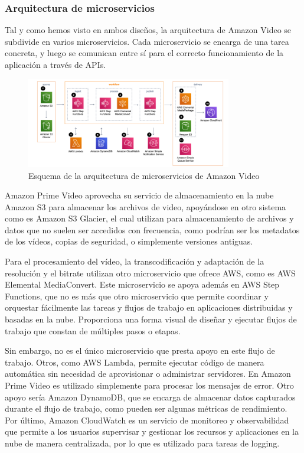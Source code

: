 \documentclass[12pt,a4paper]{article}
\begin{document}
    \subsubsection{Arquitectura de microservicios}

    Tal y como hemos visto en ambos diseños, la arquitectura de Amazon Video se subdivide en varios microservicios. Cada microservicio se encarga de una tarea concreta, y luego se comunican entre sí para el correcto funcionamiento de la aplicación a través de APIs.

    \begin{figure}[H]
        \centering
        \includegraphics[width=0.8\textwidth]{./img/arquitectura_microservicios_amazon.png}
        \caption{Esquema de la arquitectura de microservicios de Amazon Video}
        \label{fig:amazon_microservices}
    \end{figure}

    Amazon Prime Video aprovecha su servicio de almacenamiento en la nube Amazon S3 para almacenar los archivos de video, apoyándose en otro sistema como es Amazon S3 Glacier, el cual utilizan para almacenamiento de archivos y datos que no suelen ser accedidos con frecuencia, como podrían ser los metadatos de los vídeos, copias de seguridad, o simplemente versiones antiguas.

    Para el procesamiento del vídeo, la transcodificación y adaptación de la resolución y el bitrate utilizan otro microservicio que ofrece AWS, como es AWS Elemental MediaConvert. Este microservicio se apoya además en AWS Step Functions, que no es más que otro microservicio que permite coordinar y orquestar fácilmente las tareas y flujos de trabajo en aplicaciones distribuidas y basadas en la nube. Proporciona una forma visual de diseñar y ejecutar flujos de trabajo que constan de múltiples pasos o etapas.

    Sin embargo, no es el único microservicio que presta apoyo en este flujo de trabajo. Otros, como AWS Lambda, permite ejecutar código de manera automática sin necesidad de aprovisionar o administrar servidores. En Amazon Prime Video es utilizado simplemente para procesar los mensajes de error. Otro apoyo sería Amazon DynamoDB, que se encarga de almacenar datos capturados durante el flujo de trabajo, como pueden ser algunas métricas de rendimiento. Por último, Amazon CloudWatch es un servicio de monitoreo y observabilidad que permite a los usuarios supervisar y gestionar los recursos y aplicaciones en la nube de manera centralizada, por lo que es utilizado para tareas de logging.
\end{document}
